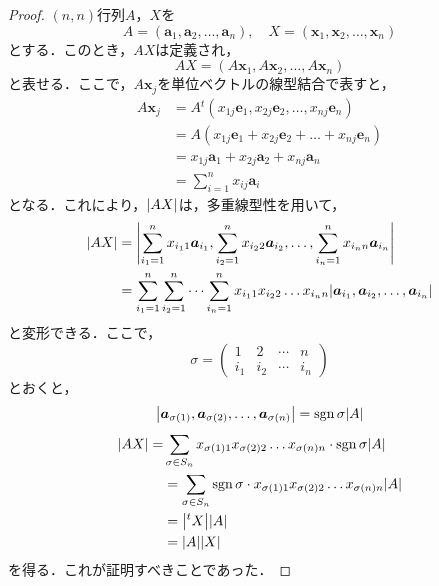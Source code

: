 \documentclass[a4paper,10pt,fleqn]{ltjsarticle}
\begin{document}
\begin{leftbar}
  \begin{proof}
    $(n,n)$行列$A$，$X$を
    \[
      A = (\bm{a}_1 ,\bm{a}_2, \dots ,\bm{a}_n) , \quad X = (\bm{x}_1,\bm{x}_2,\dots,\bm{x}_n)
    \]
    とする．このとき，$AX$は定義され，
    \[
      AX = (A\bm{x}_1 , A\bm{x}_2 , \dots ,A\bm{x}_n)
    \]
    と表せる．ここで，$A \bm{x}_j$を単位ベクトルの線型結合で表すと，
    \begin{align*}
      A \bm{x}_j & = A {}^t (x_{1j} \bm{e}_1 , x_{2j} \bm{e}_2,\ldots ,x_{nj} \bm{e}_n ) \\
                 & =A (x_{1j} \bm{e}_1 + x_{2j} \bm{e}_2+ \dots + x_{nj} \bm{e}_n)       \\
                 & = x_{1j} \bm{a}_1 + x_{2j} \bm{a}_2 + x_{nj} \bm{a}_n                 \\
                 & = \sum_{ i =1}^{n} x_{ij} \bm{a}_{i}
    \end{align*}
    となる．これにより，$\abs{AX}$は，多重線型性を用いて，
    \begin{align*}
      \abs{AX} & = \abs{\sum_{i_1 =1}^{n} x_{i_1 1} \bm{a}_{i_1} , \sum_{i_2 =1}^{n} x_{i_2 2} \bm{a}_{i_2},\ldots , \sum_{i_n =1}^{n} x_{i_n n} \bm{a}_{i_n} }        \\
               & = \sum_{i_1 =1}^{n} \sum_{i_2 = 1}^{n} \dots \sum_{i_n =1}^{n} x_{i_1 1} x_{i_2 2} \dots x_{i_n n} \abs{\bm{a}_{i_1},\bm{a}_{i_2},\dots,\bm{a}_{i_n}}
    \end{align*}
    と変形できる．ここで，
    \[
      \sigma = \begin{pmatrix} 1 & 2 & \cdots & n \\ i_1 & i_2 & \cdots & i_n \end{pmatrix}
    \]
    とおくと，
    \[
      \abs{\bm{a}_{\sigma (1)},\bm{a}_{\sigma(2)},\dots,\bm{a}_{\sigma(n)}} = \operatorname{sgn} \sigma \abs{A}
    \]
    \begin{align*}
      \abs{AX} = & \sum_{\sigma \in S_n} x_{\sigma (1)1} x_{\sigma(2)2} \dots x_{\sigma(n)n} \cdot \operatorname{sgn} \sigma  \abs{A}   \\
                 & = \sum_{\sigma \in S_n } \operatorname{sgn} \sigma \cdot x_{\sigma(1)1} x_{\sigma(2)2} \dots x_{\sigma (n)n} \abs{A} \\
                 & = \abs{{}^t X} \abs{A}                                                                                 \\
                 & = \abs{A} \abs{X}
    \end{align*}
    を得る．これが証明すべきことであった．
  \end{proof}
\end{leftbar}
\end{document}

